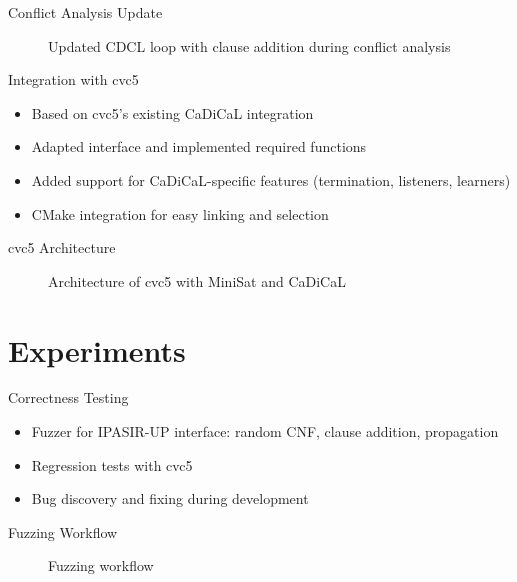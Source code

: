 \documentclass{beamer}
\begin{document}
\begin{frame}{Conflict Analysis Update}
  \begin{figure}
    \centering
    
    \caption{Updated CDCL loop with clause addition during conflict analysis}
  \end{figure}
\end{frame}

\begin{frame}{Integration with cvc5}
  \begin{itemize}
    \item Based on cvc5's existing CaDiCaL integration
    \item Adapted interface and implemented required functions
    \item Added support for CaDiCaL-specific features (termination, listeners, learners)
    \item CMake integration for easy linking and selection
  \end{itemize}
\end{frame}

\begin{frame}{cvc5 Architecture}
  \begin{figure}
    \centering
    
    \caption{Architecture of cvc5 with MiniSat and CaDiCaL}
  \end{figure}
\end{frame}


\section{Experiments}

\begin{frame}{Correctness Testing}
  \begin{itemize}
    \item Fuzzer for IPASIR-UP interface: random CNF, clause addition, propagation
    \item Regression tests with cvc5
    \item Bug discovery and fixing during development
  \end{itemize}
\end{frame}

\begin{frame}{Fuzzing Workflow}
  \begin{figure}
    \centering
    
    \caption{Fuzzing workflow}
  \end{figure}
\end{frame}
\end{document}

